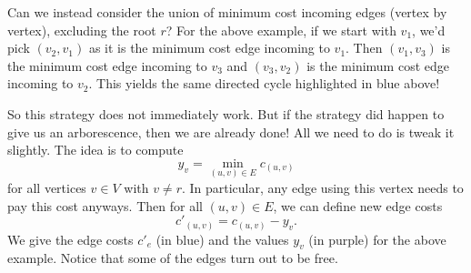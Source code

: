 Can we instead consider the union of minimum cost incoming edges 
(vertex by vertex), excluding the root $r$? For the above example, 
if we start with $v_1$, we'd pick $(v_2, v_1)$ as it is the minimum cost 
edge incoming to $v_1$. Then $(v_1, v_3)$ is the minimum cost edge 
incoming to $v_3$ and $(v_3, v_2)$ is the minimum cost edge incoming to 
$v_2$. This yields the same directed cycle highlighted in blue above!

So this strategy does not immediately work. But if the strategy 
did happen to give us an arborescence, then we are already done! 
All we need to do is tweak it slightly. The idea is to compute 
\[ y_v = \min_{(u,v)\in E} c_{(u, v)} \] 
for all vertices $v \in V$ with $v \neq r$. In particular, any edge using this 
vertex needs to pay this cost anyways. Then for all $(u, v) \in E$, we can 
define new edge costs 
\[ c'_{(u, v)} = c_{(u, v)} - y_v. \] 
We give the edge costs $c'_e$ (in blue) and the values $y_v$ (in purple) for the above example.
Notice that some of the edges turn out to be free.
\begin{center}
\end{center}
\vspace{-0.25cm}
